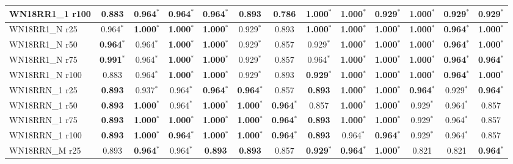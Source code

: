 \begin{table}[t]
{\begin{tabular}{l||cccccc||cccccc}
WN18RR1\_1 r100 & 0.883 & 0.964$^*$ & \textbf{0.964}$^*$ & 0.964$^*$ & 0.893 & 0.786 & \textbf{1.000}$^*$ & \textbf{1.000}$^*$ & 0.929$^*$ & \textbf{1.000}$^*$ & \textbf{0.929}$^*$ & \textbf{0.929}$^*$ \\
\hline
WN18RR1\_N r25 & 0.964$^*$ & \textbf{1.000}$^*$ & \textbf{1.000}$^*$ & \textbf{1.000}$^*$ & 0.929$^*$ & 0.893 & \textbf{1.000}$^*$ & \textbf{1.000}$^*$ & \textbf{1.000}$^*$ & \textbf{1.000}$^*$ & \textbf{0.964}$^*$ & \textbf{1.000}$^*$ \\
WN18RR1\_N r50 & \textbf{0.964}$^*$ & 0.964$^*$ & \textbf{1.000}$^*$ & \textbf{1.000}$^*$ & 0.929$^*$ & 0.857 & 0.929$^*$ & \textbf{1.000}$^*$ & \textbf{1.000}$^*$ & \textbf{1.000}$^*$ & \textbf{0.964}$^*$ & \textbf{1.000}$^*$ \\
WN18RR1\_N r75 & \textbf{0.991}$^*$ & 0.964$^*$ & \textbf{1.000}$^*$ & \textbf{1.000}$^*$ & 0.929$^*$ & 0.857 & 0.964$^*$ & \textbf{1.000}$^*$ & \textbf{1.000}$^*$ & \textbf{1.000}$^*$ & \textbf{0.964}$^*$ & \textbf{0.964}$^*$ \\
WN18RR1\_N r100 & 0.883 & 0.964$^*$ & \textbf{1.000}$^*$ & \textbf{1.000}$^*$ & 0.929$^*$ & 0.893 & \textbf{0.929}$^*$ & \textbf{1.000}$^*$ & \textbf{1.000}$^*$ & \textbf{1.000}$^*$ & \textbf{0.964}$^*$ & \textbf{1.000}$^*$ \\
\hline
WN18RRN\_1 r25 & \textbf{0.893} & 0.937$^*$ & 0.964$^*$ & \textbf{0.964}$^*$ & \textbf{0.964}$^*$ & 0.857 & \textbf{0.893} & \textbf{1.000}$^*$ & \textbf{1.000}$^*$ & \textbf{0.964}$^*$ & 0.929$^*$ & \textbf{0.964}$^*$ \\
WN18RRN\_1 r50 & \textbf{0.893} & \textbf{1.000}$^*$ & 0.964$^*$ & \textbf{1.000}$^*$ & \textbf{1.000}$^*$ & \textbf{0.964}$^*$ & 0.857 & \textbf{1.000}$^*$ & \textbf{1.000}$^*$ & 0.929$^*$ & 0.964$^*$ & 0.857 \\
WN18RRN\_1 r75 & \textbf{0.893} & \textbf{1.000}$^*$ & \textbf{1.000}$^*$ & \textbf{1.000}$^*$ & \textbf{1.000}$^*$ & \textbf{0.964}$^*$ & \textbf{0.893} & \textbf{1.000}$^*$ & \textbf{1.000}$^*$ & 0.929$^*$ & 0.964$^*$ & 0.857 \\
WN18RRN\_1 r100 & \textbf{0.893} & \textbf{1.000}$^*$ & \textbf{0.964}$^*$ & \textbf{1.000}$^*$ & \textbf{1.000}$^*$ & \textbf{0.964}$^*$ & \textbf{0.893} & 0.964$^*$ & \textbf{0.964}$^*$ & 0.929$^*$ & 0.964$^*$ & 0.857 \\
\hline
WN18RRN\_M r25 & 0.893 & \textbf{0.964}$^*$ & 0.964$^*$ & \textbf{0.893} & \textbf{0.893} & 0.857 & \textbf{0.929}$^*$ & \textbf{0.964}$^*$ & \textbf{1.000}$^*$ & 0.821 & 0.821 & \textbf{0.964}$^*$ \\

\end{tabular}}
\end{table}
